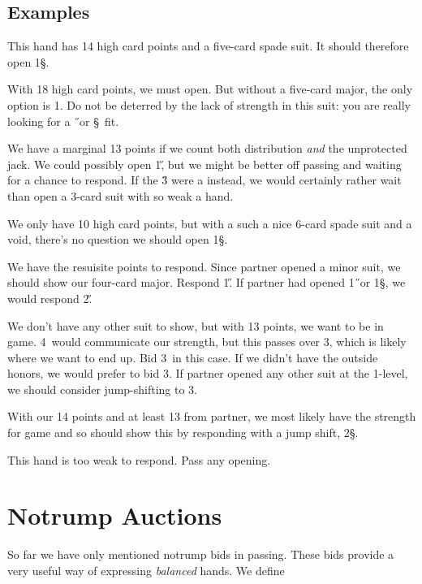 \documentclass[oneside]{memoir}
\begin{document}
\section{Examples}
\begin{description}
This hand has 14 high card points and a five-card spade suit.
It should therefore open 1\S.

With 18 high card points, we must open.  But without a five-card
major, the only option is 1\D.  Do not be deterred by the lack of strength in
this suit: you are really looking for a \H\ or \S\ fit.

We have a marginal 13 points if we count both distribution \emph{and} the
unprotected jack.  We could possibly open 1\H, but we might be better off
passing and waiting for a chance to respond.  If the \H3 were a  instead,
we would certainly rather wait than open a 3-card suit with so weak a hand.

We only have 10 high card points, but with a such a nice 6-card spade suit
and a void, there's no question we should open 1\S.

We have the resuisite points to respond.  Since partner opened a minor suit,
we should show our four-card major.  Respond 1\H.  If partner had opened
1\H\ or 1\S, we would respond 2\H.

We don't have any other suit to show, but with 13 points, we want to be in
game.  4\C\ would communicate our strength, but this passes over 3\NT, which
is likely where we want to end up.  Bid 3\NT\ in this case.  If we didn't
have the outside honors, we would prefer to bid 3\C.  If partner opened any
other suit at the 1-level, we should consider jump-shifting to 3\C.

With our 14 points and at least 13 from partner, we most likely have the
strength for game and so should show this by responding with a jump shift, 2\S.

This hand is too weak to respond.  Pass any opening.

\end{description}

\chapter{Notrump Auctions}
So far we have only mentioned notrump bids in passing.    These bids provide
a very useful way of expressing \textit{balanced} hands.  We define
\end{document}
